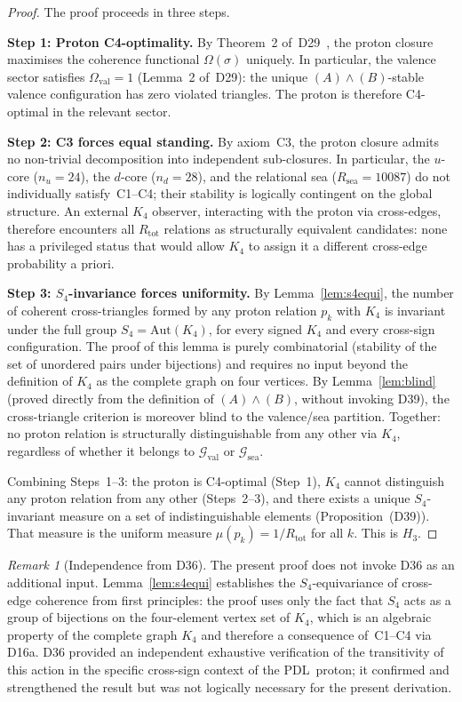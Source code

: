 \documentclass[11pt,a4paper]{article}
\theoremstyle{plain}
\theoremstyle{definition}
\theoremstyle{remark}
\newtheorem{remark}[theorem]{Remark}
\newcommand{\PDL}{\textnormal{PDL}}
\newcommand{\Kfour}{K_4}
\newcommand{\Rtot}{R_{\mathrm{tot}}}
\newcommand{\Rsea}{R_{\mathrm{sea}}}
\begin{document}
\begin{proof}
The proof proceeds in three steps.

\textbf{Step 1: Proton C4-optimality.} By Theorem~2 of~D29~\cite{PDL_D29_2026}, the proton closure maximises the coherence functional $\Omega(\sigma)$ uniquely. In particular, the valence sector satisfies $\Omega_{\mathrm{val}} = 1$ (Lemma~2 of~D29): the unique $(A)\wedge(B)$-stable valence configuration has zero violated triangles. The proton is therefore C4-optimal in the relevant sector.

\textbf{Step 2: C3 forces equal standing.} By axiom~C3, the proton closure admits no non-trivial decomposition into independent sub-closures. In particular, the $u$-core ($n_u = 24$), the $d$-core ($n_d = 28$), and the relational sea ($\Rsea = 10087$) do not individually satisfy~C1--C4; their stability is logically contingent on the global structure. An external $\Kfour$ observer, interacting with the proton via cross-edges, therefore encounters all $\Rtot$ relations as structurally equivalent candidates: none has a privileged status that would allow $\Kfour$ to assign it a different cross-edge probability a priori.

\textbf{Step 3: $S_4$-invariance forces uniformity.} By Lemma~\ref{lem:s4equi}, the number of coherent cross-triangles formed by any proton relation $p_k$ with $\Kfour$ is invariant under the full group $S_4 = \mathrm{Aut}(\Kfour)$, for every signed $\Kfour$ and every cross-sign configuration. The proof of this lemma is purely combinatorial (stability of the set of unordered pairs under bijections) and requires no input beyond the definition of $\Kfour$ as the complete graph on four vertices. By Lemma~\ref{lem:blind} (proved directly from the definition of $(A)\wedge(B)$, without invoking D39), the cross-triangle criterion is moreover blind to the valence/sea partition. Together: no proton relation is structurally distinguishable from any other via $\Kfour$, regardless of whether it belongs to $\mathcal{G}_{\mathrm{val}}$ or $\mathcal{G}_{\mathrm{sea}}$.

Combining Steps~1--3: the proton is C4-optimal (Step~1), $\Kfour$ cannot distinguish any proton relation from any other (Steps~2--3), and there exists a unique $S_4$-invariant measure on a set of indistinguishable elements (Proposition~(D39)). That measure is the uniform measure $\mu(p_k) = 1/\Rtot$ for all $k$. This is $H_3$.
\end{proof}

\begin{remark}[Independence from D36]
The present proof does not invoke D36 as an additional input. Lemma~\ref{lem:s4equi} establishes the $S_4$-equivariance of cross-edge coherence from first principles: the proof uses only the fact that $S_4$ acts as a group of bijections on the four-element vertex set of $\Kfour$, which is an algebraic property of the complete graph $K_4$ and therefore a consequence of~C1--C4 via D16a. D36 provided an independent exhaustive verification of the transitivity of this action in the specific cross-sign context of the \PDL\ proton; it confirmed and strengthened the result but was not logically necessary for the present derivation.
\end{remark}
\end{document}
